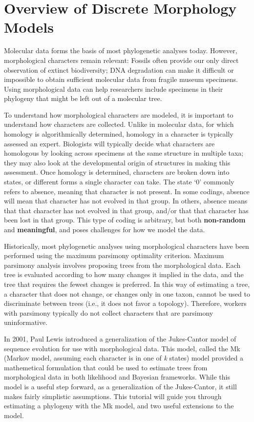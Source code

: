 \section{Overview of Discrete Morphology Models} \label{sec:dm_overview}

Molecular data forms the basis of most phylogenetic analyses today. 
However, morphological characters remain relevant: Fossils often provide our only direct observation of extinct biodiversity; DNA degradation can make it difficult or impossible to obtain sufficient molecular data from fragile museum specimens. 
Using morphological data can help researchers include specimens in their phylogeny that might be left out of a molecular tree. \par
To understand how morphological characters are modeled, it is important to understand how characters are collected.
Unlike in molecular data, for which homology is algorithmically determined, homology in a character is typically assessed an expert. 
Biologists will typically decide what characters are homologous by looking across specimens at the same structure in multiple taxa; they may also look at the developmental origin of structures in making this assessment.
Once homology is determined, characters are broken down into states, or different forms a single character can take.
The state `0' commonly refers to absence, meaning that character is not present.
In some codings, absence will mean that character has not evolved in that group.
In others, absence means that that character has not evolved in that group, and/or that that character has been lost in that group. 
This type of coding is arbitrary, but both \textbf{non-random} and \textbf{meaningful}, and poses challenges for how we model the data. 
\par

Historically, most phylogenetic analyses using morphological characters have been performed using the maximum parsimony optimality criterion. 
Maximum parsimony analysis involves proposing trees from the morphological data.
Each tree is evaluated according to how many changes it implied in the data, and the tree that requires the fewest changes is preferred.
In this way of estimating a tree, a character that does not change, or changes only in one taxon, cannot be used to discriminate between trees (i.e., it does not favor a topology).
Therefore, workers with parsimony typically do not collect characters that are parsimony uninformative.
\par

In 2001, Paul Lewis introduced a generalization of the Jukes-Cantor model of sequence evolution for use with morphological data.
This model, called the Mk (Markov model, assuming each character is in one of \textit{k} states) model provided a mathemetical formulation that could be used to estimate trees from morphological data in both likelihood and Bayesian frameworks. 
While this model is a useful step forward, as a generalization of the Jukes-Cantor, it still makes fairly simplistic assumptions.
This tutorial will guide you through estimating a phylogeny with the Mk model, and two useful extensions to the model. \par

